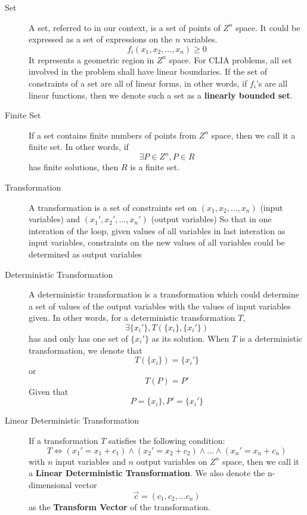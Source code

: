 \documentclass[letterpaper,]{article}
\begin{document}
\begin{description}
\item[Set]
A set, referred to in our context, is a set of points of \(Z^n\) space.
It could be expressed as a set of expressions on the \(n\)
variables.\[f_i(x_1, x_2, \dots, x_n) \ge 0\] It represents a geometric
region in \(Z^n\) space. For CLIA problems, all set involved in the
problem shall have linear boundaries. If the set of constraints of a set
are all of linear forms, in other words, if \(f_i\)'s are all linear
functions, then we denote such a set as a \textbf{linearly bounded set}.
\item[Finite Set]
If a set contains finite numbers of points from \(Z^n\) space, then we
call it a finite set. In other words, if \[\exists P\in Z^n, P \in R \]
has finite solutions, then \(R\) is a finite set.
\item[Transformation]
A transformation is a set of constraints set on
\((x_1, x_2, \dots, x_n)\) (input variables) and
\((x_1', x_2', \dots, x_n')\) (output variables) So that in one
interation of the loop, given values of all variables in last interation
as input variables, constraints on the new values of all variables could
be determined as output variables
\item[Deterministic Transformation]
A deterministic transformation is a transformation which could determine
a set of values of the output variables with the values of input
variables given. In other words, for a deterministic transformation
\(T\), \[\exists \{x_i'\}, T(\{x_i\}, \{x_i'\}) \] has and only has one
set of \(\{x_i'\}\) as its solution. When \(T\) is a deterministic
transformation, we denote that \[T(\{x_i\}) = \{x_i'\}\] or
\[T(P) = P' \] Given that \[P = \{x_i\}, P' = \{x_i'\}\]
\item[Linear Deterministic Transformation]
If a transformation \(T\) satisfies the following condition:
\[ T \Leftrightarrow (x_1' = x_1 + c_1) \land (x_2' = x_2 + c_2) \land
\dots \land (x_n' = x_n + c_n) \] with \(n\) input variables and \(n\)
output variables on \(Z^n\) space, then we call it a \textbf{Linear
Deterministic Transformation}. We also denote the n-dimensional vector
\[ \vec{c} =  (c_1, c_2, \dots c_n) \] as the \textbf{Transform Vector}
of the transformation.


\end{description}
\end{document}
